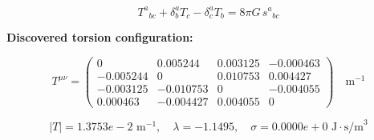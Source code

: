 
\begin{equation}
  T^a{}_{bc} + \delta^a_b T_c - \delta^a_c T_b = 8\pi G \, s^a{}_{bc}
\end{equation}

\textbf{Discovered torsion configuration:}

\begin{equation}
  T^{\mu\nu} = \begin{pmatrix}
    0 & 0.005244 & 0.003125 & -0.000463 \\
    -0.005244 & 0 & 0.010753 & 0.004427 \\
    -0.003125 & -0.010753 & 0 & -0.004055 \\
    0.000463 & -0.004427 & 0.004055 & 0
  \end{pmatrix} \quad \text{m}^{-1}
\end{equation}

\begin{equation}
  |T| = 1.3753e-2 \text{ m}^{-1}, \quad
  \lambda = -1.1495, \quad
  \sigma = 0.0000e+0 \text{ J}\cdot\text{s/m}^3
\end{equation}
